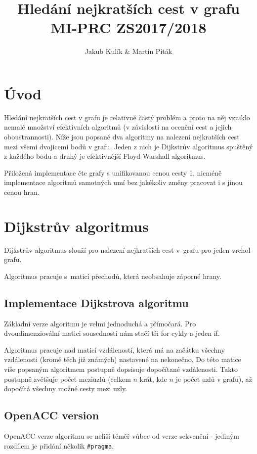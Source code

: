 \documentclass[11pt, fleqn]{article}
\title{Hledání nejkratších cest v grafu \\ MI-PRC ZS2017/2018}
\author{Jakub Kulík \& Martin Piták}
\begin{document}
\maketitle

\section{Úvod}

Hledání nejkratších cest v grafu je relativně častý problém a proto na něj vzniklo nemalé množství efektivních algoritmů (v závislosti na ocenění cest a jejich oboustrannosti). Níže jsou popsané dva algoritmy na nalezení nejkratších cest mezi všemi dvojicemi bodů v grafu. Jeden z nich je Dijkstrův algoritmus spuštěný z každého bodu a druhý je efektivnější Floyd-Warshall algoritmus.

Přiložená implementace čte grafy s unifikovanou cenou cesty 1, nicméně implementace algoritmů samotných umí bez jakékoliv změny pracovat i s jinou cenou hran.

\section{Dijkstrův algoritmus}

Dijkstrův algoritmus slouží pro nalezení nejkratších cest v~grafu pro jeden vrchol grafu.

Algoritmus pracuje s~maticí přechodů, která neobsahuje záporné hrany.

\subsection{Implementace Dijkstrova algoritmu}
Základní verze algoritmu je velmi jednoduchá a přímočará. Pro dvoudimenziovální matici sousednosti nám stačí tři for cykly a jeden if.

Algoritmus pracuje nad maticí vzdáleností, která má na začátku všechny vzdálenosti (kromě těch již známých) nastavené na nekonečno. Do této matice víše popsaným algoritmem postupně dopsisuje dopočítané vzdálenosti. Takto postupně zvětšuje počet meziuzlů (celkem $n$ krát, kde $n$ je počet uzlů v grafu), až dopočítá všechny možné cesty mezi uzly.

\subsection{OpenACC version}
OpenACC verze algoritmu se neliší téměř vůbec od verze sekvenční - jediným rozdílem je přidání několik \lstinline{#pragma}.
\end{document}
